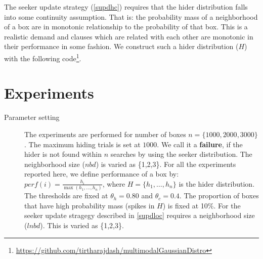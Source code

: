 \documentclass[11pt,a4paper,draft]{article}
\begin{document}
\noindent
The seeker update strategy (\ref{supdhc}) requires that the hider distribution falls into some continuity assumption. That is: the probability mass of a neighborhood of a box are in monotonic relationship to the probability of that box. This is a realistic demand and clauses which are related with each other are monotonic in their performance in some fashion. We construct such a hider distribution ($H$) with the following code\footnote{\url{https://github.com/tirtharajdash/multimodalGaussianDistro}}.

\section{Experiments} \label{base_expt}

\begin{description}
	\item[Parameter setting] The experiments are performed for number of boxes $n = \{1000, 2000, 3000\}$. The maximum hiding trials is set at $1000$. We call it a \textbf{failure}, if the hider is not found within $n$ searches by using the seeker distribution. The neighborhood size ($nbd$) is varied as \{1,2,3\}. For all the experiments reported here, we define performance of a box by: $perf(i) = \frac{h_i}{\max(h_1,\ldots, h_n)}$, where $H = \{h_1,\ldots, h_n\}$ is the hider distribution. The thresholds are fixed at $\theta_h = 0.80$ and $\theta_c = 0.4$. The proportion of boxes that have high probability mass (spikes in $H$) is fixed at 10\%. For the seeker update stragegy described in \ref{supdloc} requires a neighborhood size ($lnbd$). This is varied as \{1,2,3\}.
	\label{setting:base}


\end{description}
\end{document}
